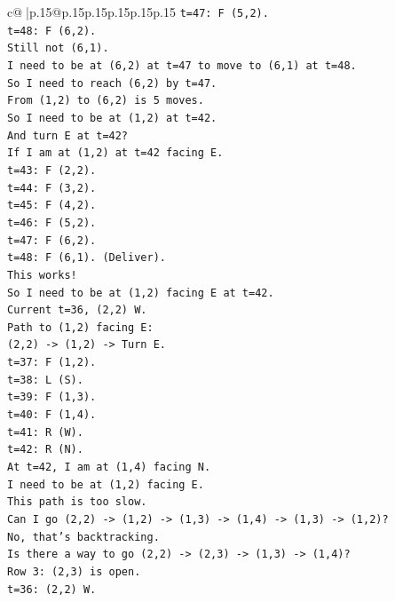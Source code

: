 \documentclass{article}
\begin{document}
{\begin{supertabular}{c@{$\;$}|p{.15\linewidth}@{}p{.15\linewidth}p{.15\linewidth}p{.15\linewidth}p{.15\linewidth}p{.15\linewidth}}
{{{\texttt{t=47: F (5,2).} \\
\texttt{t=48: F (6,2).} \\
\texttt{Still not (6,1).} \\
\texttt{I need to be at (6,2) at t=47 to move to (6,1) at t=48.} \\
\texttt{So I need to reach (6,2) by t=47.} \\
\texttt{From (1,2) to (6,2) is 5 moves.} \\
\texttt{So I need to be at (1,2) at t=42.} \\
\texttt{And turn E at t=42?} \\
\texttt{If I am at (1,2) at t=42 facing E.} \\
\texttt{t=43: F (2,2).} \\
\texttt{t=44: F (3,2).} \\
\texttt{t=45: F (4,2).} \\
\texttt{t=46: F (5,2).} \\
\texttt{t=47: F (6,2).} \\
\texttt{t=48: F (6,1). (Deliver).} \\
\texttt{This works!} \\
\texttt{So I need to be at (1,2) facing E at t=42.} \\
\texttt{Current t=36, (2,2) W.} \\
\texttt{Path to (1,2) facing E:} \\
\texttt{(2,2) {-}> (1,2) {-}> Turn E.} \\
\texttt{t=37: F (1,2).} \\
\texttt{t=38: L (S).} \\
\texttt{t=39: F (1,3).} \\
\texttt{t=40: F (1,4).} \\
\texttt{t=41: R (W).} \\
\texttt{t=42: R (N).} \\
\texttt{At t=42, I am at (1,4) facing N.} \\
\texttt{I need to be at (1,2) facing E.} \\
\texttt{This path is too slow.} \\
\texttt{Can I go (2,2) {-}> (1,2) {-}> (1,3) {-}> (1,4) {-}> (1,3) {-}> (1,2)?} \\
\texttt{No, that's backtracking.} \\
\texttt{Is there a way to go (2,2) {-}> (2,3) {-}> (1,3) {-}> (1,4)?} \\
\texttt{Row 3: (2,3) is open.} \\
\texttt{t=36: (2,2) W.} \\
}}}
\end{supertabular}}
\end{document}
